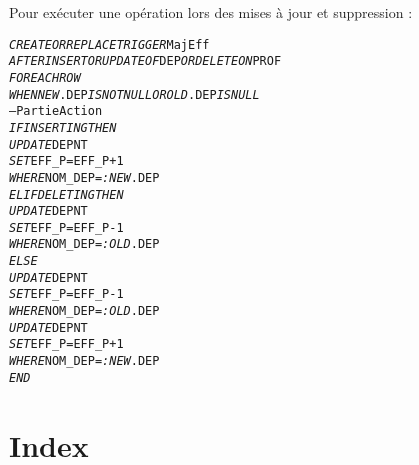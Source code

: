 \documentclass[10pt]{article}
\begin{document}
                Pour exécuter une opération lors des mises à jour et suppression :
                \begin{alltt}
                    \begin{tabbing}
\emph{CREATE OR REPLACE TRIGGER} MajEff\\
\emph{AFTER INSERT OR UPDATE OF} DEP \emph{OR DELETE ON} PROF\\
\emph{FOR EACH ROW}\\
\emph{WHEN NEW}.DEP \emph{IS NOT NULL OR OLD}.DEP \emph{IS NULL}\\
-- Partie Action\\
\emph{IF}\=\emph{INSERTING THEN}\\
    \>  \emph{UPDATE} DEPNT\\
    \>  \emph{SET} EFF_P=EFF_P+1\\
    \>  \emph{WHERE} NOM_DEP=\emph{:NEW}.DEP\\
\emph{ELIF}\=\emph{DELETING THEN}\\
    \>\emph{UPDATE} DEPNT\\
    \>\emph{SET} EFF_P=EFF_P-1\\
    \>\emph{WHERE} NOM_DEP=\emph{:OLD}.DEP\\
\emph{ELSE}\=\\
    \>\emph{UPDATE} DEPNT\\
    \>\emph{SET} EFF_P=EFF_P-1\\
    \>\emph{WHERE} NOM_DEP=\emph{:OLD}.DEP\\
    \>\emph{UPDATE} DEPNT\\
    \>\emph{SET} EFF_P=EFF_P+1\\
    \>\emph{WHERE} NOM_DEP=\emph{:NEW}.DEP\\
\emph{END}
                    \end{tabbing}
                \end{alltt}
\newpage
\part*{Index}
\tableofcontents
\newpage
\listoftables
\listoffigures
\renewcommand{\indexname}{Liste des mots-clefs PL/SQL} \printindex
\end{document}
